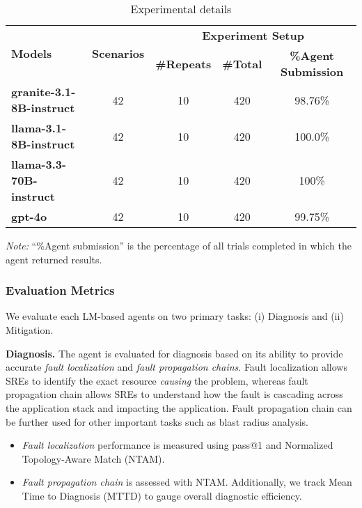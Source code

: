\begin{table*}[htp]
\centering
\begin{threeparttable}
\caption{Experimental details}
\label{tab:exp-setup-sre}
\begin{tabular}{@{}l c c c c@{}}
\toprule
\multirow{2}{*}{\textbf{Models}} 
 & \multirow{2}{*}{\textbf{Scenarios}}
 & \multicolumn{3}{c}{\textbf{Experiment Setup}} \\
\cmidrule(lr){3-5}
 & 
 & \textbf{\#Repeats} 
 & \textbf{\#Total} 
 & \textbf{\%Agent Submission} \\
\midrule
\textbf{granite-3.1-8B-instruct}         & 42 & 10 & 420 & 98.76\% \\
\textbf{llama-3.1-8B-instruct} & 42 & 10 & 420  & 100.0\% \\
\textbf{llama-3.3-70B-instruct} & 42 & 10 & 420 & 100\% \\
\textbf{gpt-4o}                       & 42 & 10 & 420 & 99.75\% \\
\bottomrule
\end{tabular}
\begin{tablenotes}
\footnotesize
\item \textit{Note:} “\%Agent submission” is the percentage of all trials completed in which the agent returned results. 
\end{tablenotes}
\end{threeparttable}
\end{table*}

\subsubsection{Evaluation Metrics}
\label{sss:eval-metrics}

We evaluate each LM-based agents on two primary tasks: (i) Diagnosis and (ii) Mitigation.

\textbf{Diagnosis.}
The agent is evaluated for diagnosis based on its ability to provide accurate \textit{fault localization} and \textit{fault propagation chains}.
Fault localization allows SREs to identify the exact resource \textit{causing} the problem, whereas fault propagation chain allows SREs to understand how the fault is cascading across the application stack and impacting the application. 
Fault propagation chain can be further used for other important tasks such as blast radius analysis.
\begin{itemize}[left=0pt, topsep=0pt, partopsep=0pt, itemsep=0pt, parsep=0pt]
    \item 	\textit{Fault localization} performance is measured using pass@1 and Normalized Topology-Aware Match (NTAM).
	\item \textit{Fault propagation chain} is assessed with NTAM.
	Additionally, we track Mean Time to Diagnosis (MTTD) to gauge overall diagnostic efficiency.
\end{itemize}

